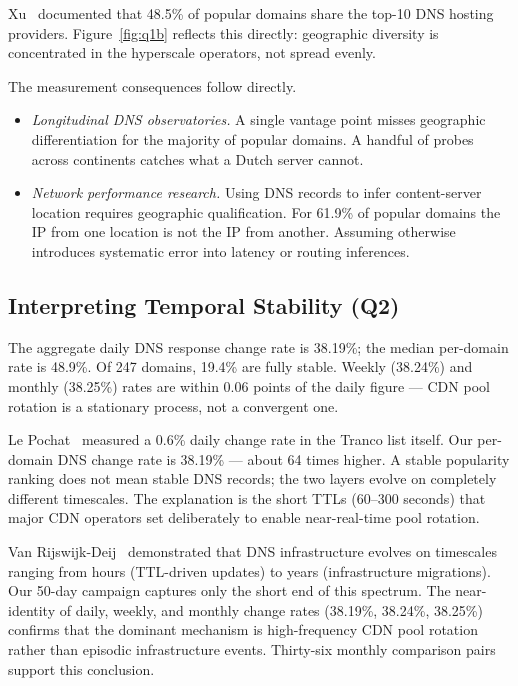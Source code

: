 Xu~\cite{Xu2023} documented that 48.5\% of popular domains share the top-10 \ac{DNS} hosting providers. Figure~\ref{fig:q1b} reflects this directly: geographic diversity is concentrated in the hyperscale operators, not spread evenly.

The measurement consequences follow directly.

\begin{itemize}
  \item \textit{Longitudinal \ac{DNS} observatories.} A single vantage point misses geographic differentiation for the majority of popular domains. A handful of probes across continents catches what a Dutch server cannot.
  \item \textit{Network performance research.} Using \ac{DNS} records to infer content-server location requires geographic qualification. For 61.9\% of popular domains the \ac{IP} from one location is not the \ac{IP} from another. Assuming otherwise introduces systematic error into latency or routing inferences.
\end{itemize}

\bigskip
\subsection{Interpreting Temporal Stability (Q2)}
\label{subsec:5.1.2}

The aggregate daily \ac{DNS} response change rate is 38.19\%; the median per-domain rate is 48.9\%. Of 247 domains, 19.4\% are fully stable. Weekly (38.24\%) and monthly (38.25\%) rates are within 0.06 points of the daily figure --- \ac{CDN} pool rotation is a stationary process, not a convergent one.

Le Pochat~\cite{LePochat2019} measured a 0.6\% daily change rate in the Tranco list itself. Our per-domain \ac{DNS} change rate is 38.19\% --- about 64 times higher. A stable popularity ranking does not mean stable \ac{DNS} records; the two layers evolve on completely different timescales. The explanation is the short \ac{TTL}s (60--300 seconds) that major \ac{CDN} operators set deliberately to enable near-real-time pool rotation.

Van Rijswijk-Deij~\cite{vanRijswijk2016} demonstrated that \ac{DNS} infrastructure evolves on timescales ranging from hours (\ac{TTL}-driven updates) to years (infrastructure migrations). Our 50-day campaign captures only the short end of this spectrum. The near-identity of daily, weekly, and monthly change rates (38.19\%, 38.24\%, 38.25\%) confirms that the dominant mechanism is high-frequency \ac{CDN} pool rotation rather than episodic infrastructure events. Thirty-six monthly comparison pairs support this conclusion.

